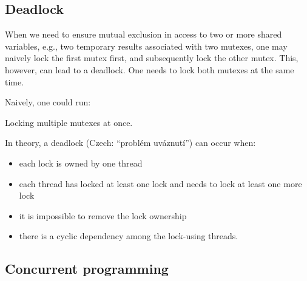 \subsection{Deadlock}

When we need to ensure mutual exclusion in access to two or more shared variables, 
e.g., two temporary results associated with two mutexes, 
one may naively lock the first mutex first, and subsequently lock the other mutex. This, however, 
can lead to a deadlock. One needs to lock both mutexes at the same time.  

Naively, one could run:

\raggedbottom
\begin{codebox}[]{\href{https://godbolt.org/z/vbhK6anev}{\ExternalLink}}
\footnotesize Locking multiple mutexes at once.
\tcblower
{}
\end{codebox}

In theory, a deadlock (Czech: ``problém uváznutí'') can occur when:
\begin{itemize}
\item each lock is owned by one thread
\item each thread has locked at least one lock and needs to lock at least one more lock
\item it is impossible to remove the lock ownership
\item there is a cyclic dependency among the lock-using threads.
\end{itemize}

\subsection{Concurrent programming}


